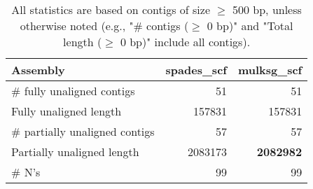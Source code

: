 \documentclass[12pt,a4paper]{article}
\begin{document}
\begin{table}[ht]
\begin{center}
\caption{All statistics are based on contigs of size $\geq$ 500 bp, unless otherwise noted (e.g., "\# contigs ($\geq$ 0 bp)" and "Total length ($\geq$ 0 bp)" include all contigs).}
\begin{tabular}{|l*{2}{|r}|}
\hline
Assembly & spades\_scf & mulksg\_scf \\ \hline
\# fully unaligned contigs & 51 & 51 \\ \hline
Fully unaligned length & 157831 & 157831 \\ \hline
\# partially unaligned contigs & 57 & 57 \\ \hline
Partially unaligned length & 2083173 & {\bf 2082982} \\ \hline
\# N's & 99 & 99 \\ \hline
\end{tabular}
\end{center}
\end{table}
\end{document}
